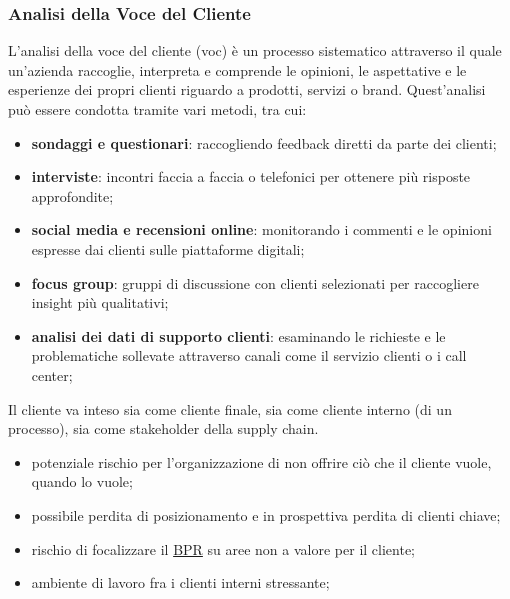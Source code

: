\subsubsection{Analisi della Voce del Cliente}\label{sub:bpr_analisi_della_voce_del_cliente} %
L'analisi della voce del cliente (\acl{voc}) è un processo sistematico attraverso il quale un'azienda raccoglie, interpreta e comprende le opinioni, le aspettative e le esperienze dei propri clienti riguardo a prodotti, servizi o brand.
Quest'analisi può essere condotta tramite vari metodi, tra cui:
\begin{itemize}
    \item \textbf{sondaggi e questionari}: raccogliendo feedback diretti da parte dei clienti;
    \item \textbf{interviste}: incontri faccia a faccia o telefonici per ottenere più risposte approfondite;
    \item \textbf{social media e recensioni online}: monitorando i commenti e le opinioni espresse dai clienti sulle piattaforme digitali;
    \item \textbf{focus group}: gruppi di discussione con clienti selezionati per raccogliere insight più qualitativi;
    \item \textbf{analisi dei dati di supporto clienti}: esaminando le richieste e le problematiche sollevate attraverso canali come il servizio clienti o i call center;
\end{itemize}
Il cliente va inteso sia come cliente finale, sia come cliente interno (di un processo), sia come stakeholder della supply chain.
\begin{warning}
    \begin{itemize}
        \item potenziale rischio per l'organizzazione di non offrire ciò che il cliente vuole, quando lo vuole;
        \item possibile perdita di posizionamento e in prospettiva perdita di clienti chiave;
        \item rischio di focalizzare il \hyperref[sec:il_business_process_reengineering]{BPR} su aree non a valore per il cliente;
        \item ambiente di lavoro fra i clienti interni stressante;
    \end{itemize}
\end{warning}
%
